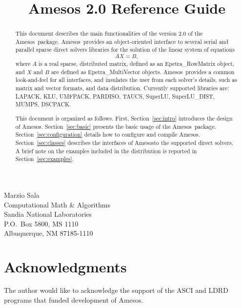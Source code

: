 \documentclass[11pt]{SANDreport}
\title{Amesos 2.0 Reference Guide}
\newcommand{\amesos}{{\sc Amesos}}
\begin{document}
\maketitle

\begin{center}
Marzio  Sala \\
Computational Math \& Algorithms \\
Sandia National Laboratories\\
P.O.~Box 5800, MS 1110 \\
Albuquerque, NM 87185-1110
\end{center}

\vspace{20pt}

\begin{abstract}
  This document describes the main functionalities of the version 2.0 of the
  \amesos\ package. \amesos\ provides an
  object-oriented interface to several serial and parallel sparse direct
  solvers libraries for the solution of the linear system of equations
  \begin{equation}
    \label{eq:linear_system}
    A X = B,
  \end{equation}
  where $A$ is a real sparse, distributed matrix, defined as an
  Epetra\_RowMatrix object, and $X$ and $B$ are defined as
  Epetra\_MultiVector objects.   \amesos\ provides a common look-and-feel
  for all interfaces, and insulates the user from each solver's details, such as matrix and
  vector formats, and data distribution. Currently supported libraries are:
  LAPACK, KLU, UMFPACK, PARDISO, TAUCS, SuperLU, SuperLU\_DIST, MUMPS, DSCPACK.
  
  \smallskip

  This document is organized as follows. First, Section~\ref{sec:intro}
  introduces the design of \amesos.  Section~\ref{sec:basic} presents
  the basic usage of the \amesos\ package. Section~\ref{sec:configuration}
  details how to configure and compile \amesos.
  Section~\ref{sec:classes} describes the interfaces of \amesos to the supported
  direct solvers. A brief note on
  the examples included in the distribution is reported in Section~\ref{sec:examples}.
\end{abstract}

\clearpage

\clearpage

\section*{Acknowledgments}
The author would like to acknowledge the support of the ASCI and LDRD programs
that funded development of \amesos.
\end{document}
